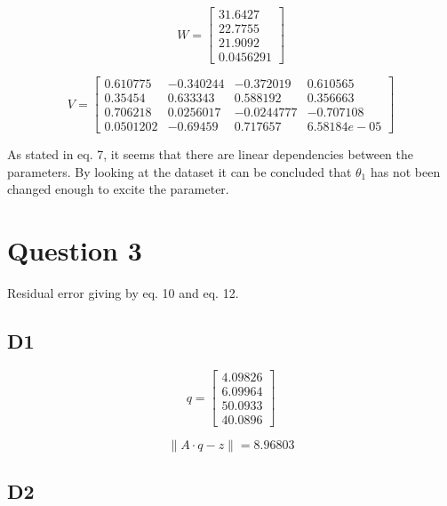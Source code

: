 \begin{equation}
W=\begin{bmatrix} 31.6427 \\ 22.7755 \\ 21.9092 \\ 0.0456291  \end{bmatrix}
\label{eq:} 
\end{equation}

\begin{equation}
V=\begin{bmatrix}  

0.610775 & -0.340244 & -0.372019 & 0.610565 \\
0.35454 & 0.633343 & 0.588192 & 0.356663 \\
0.706218 & 0.0256017 & -0.0244777 & -0.707108 \\
0.0501202 & -0.69459 & 0.717657 & 6.58184e-05  \end{bmatrix}
\label{eq:} 
\end{equation}

As stated in eq. 7, it seems that there are linear dependencies between the parameters. 
By looking at the dataset it can be concluded that $\theta_1$ has not been changed 
enough to excite the parameter.

\section*{Question 3}
Residual error giving by eq. 10 and eq. 12.

\subsection*{D1}
\begin{equation}
q=\begin{bmatrix} 4.09826 \\ 6.09964 \\ 50.0933 \\ 40.0896  \end{bmatrix}
\label{eq:} 
\end{equation}

\begin{equation}
\left\| A\cdot q-z \right\| = 8.96803
\label{eq:} 
\end{equation}


\subsection*{D2}

